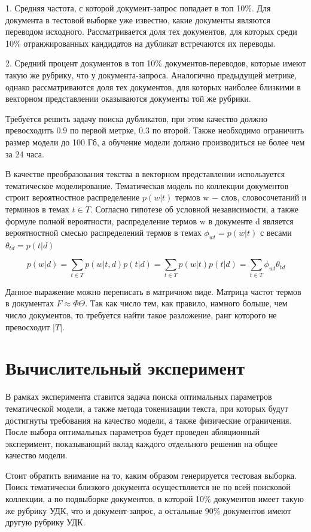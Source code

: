 \documentclass[12pt, twoside]{article}
\begin{document}
1. Средняя частота, с которой документ-запрос попадает в топ 10\%.  Для документа в тестовой выборке уже известно, какие документы являются переводом исходного. Рассматривается доля тех документов, для которых среди 10\% отранжированных кандидатов на дубликат встречаются их переводы. 

2. Средний процент документов в топ 10\% документов-переводов, которые имеют такую же рубрику, что у документа-запроса. Аналогично предыдущей метрике, однако рассматриваются доля тех документов, для которых наиболее близкими в векторном представлении оказываются документы той же рубрики.

Требуется решить задачу поиска дубликатов, при этом качество должно превосходить 0.9 по первой метрке, 0.3 по второй. Также необходимо ограничить размер модели до 100 Гб, а обучение модели должно производиться не более чем за 24 часа.

В качестве преобразования текства в векторном представлении используется тематическое моделирование. Тематическая модель \cite{basetematic}  по коллекции документов строит вероятностное распределение $p(w|t)$ термов w $-$ слов, словосочетаний и терминов в темах $t \in T$. Согласно гипотезе об условной независимости, а также формуле полной вероятности, распределение термов w в документе d является вероятностной смесью распределений термов в темах $\phi_{wt} = p(w|t)$ с весами $\theta_{td}=p(t|d)$

$$p(w|d) = \sum_{t \in T} p(w|t, d)p(t|d) = \sum_{t \in T} p(w|t)p(t|d) =\sum_{t\in T}\phi_{wt}\theta_{td}$$

Данное выражение можно переписать в матричном виде. Матрица частот термов в документах $F \approx \Phi \Theta$. Так как число тем, как правило, намного больше, чем число документов, то требуется найти такое разложение, ранг которого не превосходит $|T|$.


\section{Вычислительный эксперимент}

В рамках эксперимента ставится задача поиска оптимальных параметров тематической модели, а также метода токенизации текста, при которых будут достигнуты требования на качество модели, а также физические ограничения. После выбора оптимальных параметров будет проведен абляционный эксперимент, показывающий вклад каждого отдельного решения на общее качество модели.

Стоит обратить внимание на то, каким образом генерируется тестовая выборка. Поиск тематически близкого документа осуществляется не по всей поисковой коллекции, а по подвыборке документов, в которой 10\% документов имеет такую же рубрику УДК, что и документ-запрос, а остальные 90\% документов имеют другую рубрику УДК.
\end{document}
